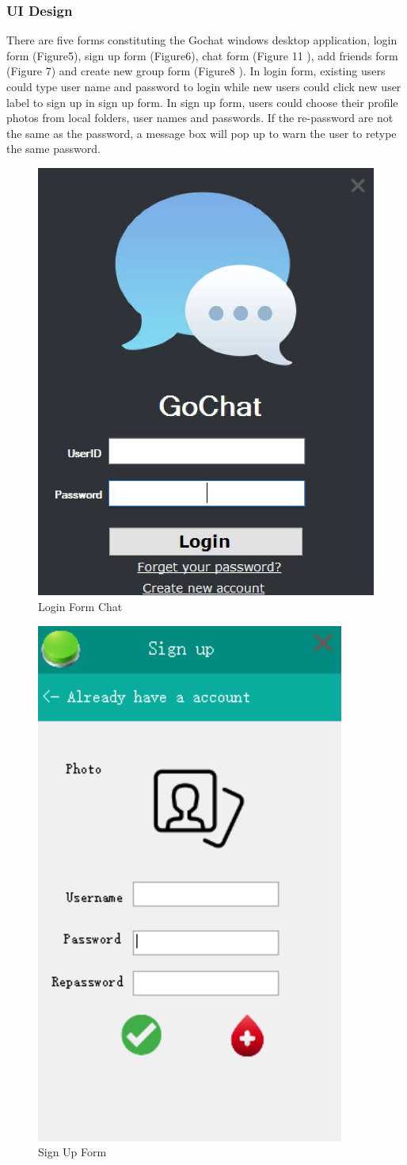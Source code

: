 \documentclass[a4paper,11pt]{article}
\begin{document}
\subsubsection{UI Design}
There are five forms constituting the Gochat windows desktop application, login form (Figure5), sign up form (Figure6), chat form (Figure 11 ), add friends form (Figure 7) and create new group form (Figure8 ). In login form, existing users could type user name and password to login while new users could click new user label to sign up in sign up form. In sign up form, users could choose their profile photos from local folders, user names and passwords. If the re-password are not the same as the password, a message box will pop up to warn the user to retype the same password. 

\begin{figure}[h!]
\centering
\includegraphics[width = 0.5 \textwidth ]{login_form.jpg}
\caption{\label{fig:UML}Login Form Chat}
\end{figure}

\begin{figure}[h!]
\centering
\includegraphics[width = 0.5 \textwidth ]{SignUpForm.PNG}
\caption{\label{fig:UML}Sign Up Form }
\end{figure}
\end{document}
